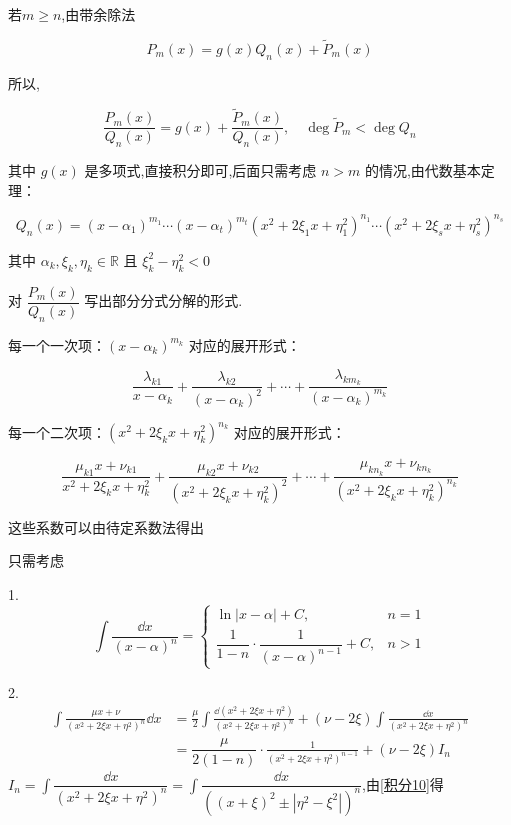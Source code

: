 \begin{solution}
	若\( m \geqslant n \),由带余除法 
	
	\[
	P_m(x) = g(x) Q_n(x) + \tilde{P}_m(x)
	\]
	
	所以,
	
	\[
	\frac{P_m(x)}{Q_n(x)} = g(x) + \frac{\tilde{P}_m(x)}{Q_n(x)}, \quad \deg \tilde{P}_m < \deg Q_n
	\]
	
	其中 \( g(x) \) 是多项式,直接积分即可,后面只需考虑 \( n > m \) 的情况,由代数基本定理：
	
	\[
	Q_n(x) = (x - \alpha_1)^{m_1} \cdots (x - \alpha_t)^{m_t} (x^2 + 2\xi_1 x + \eta_1^2)^{n_1} \cdots (x^2 + 2\xi_s x + \eta_s^2)^{n_s}
	\]
	
	其中 \(\alpha_k, \xi_k, \eta_k \in \mathbb{R}\) 且 \(\xi_k^2 - \eta_k^2 < 0\)
	
	对 \(\dfrac{P_m(x)}{Q_n(x)}\) 写出部分分式分解的形式.
	
	每一个一次项：$(x - \alpha_k)^{m_k}$ 对应的展开形式：
	
	\[
	\frac{\lambda_{k1}}{x - \alpha_k} + \frac{\lambda_{k2}}{(x - \alpha_k)^2} + \cdots + \frac{\lambda_{km_k}}{(x - \alpha_k)^{m_k}}
	\]
	
	每一个二次项：$(x^2 + 2\xi_k x + \eta_k^2)^{n_k}$ 对应的展开形式：
	
	\[
	\frac{\mu_{k1}x + \nu_{k1}}{x^2 + 2\xi_k x + \eta_k^2} + \frac{\mu_{k2}x + \nu_{k2}}{(x^2 + 2\xi_k x + \eta_k^2)^2} + \cdots + \frac{\mu_{kn_k}x + \nu_{kn_k}}{(x^2 + 2\xi_k x + \eta_k^2)^{n_k}}
	\]
	
	这些系数可以由待定系数法得出
	
	只需考虑
	
	1.
	\[
	\int \frac{\dd x}{(x - \alpha)^n} =
	\begin{cases}
		\ln |x - \alpha| + C, & n = 1 \\
		\dfrac{1}{1-n} \cdot \dfrac{1}{(x - \alpha)^{n-1}} + C, & n >1
	\end{cases}
	\]
	
	2.\[\begin{aligned}
		\int \frac{\mu x + \nu}{(x^2 + 2\xi x + \eta^2)^n} \dd x &= \frac{\mu}{2} \int \frac{\dd(x^2 + 2\xi x + \eta^2)}{(x^2 + 2\xi x + \eta^2)^n} + (\nu-2\xi) \int \frac{\dd x}{(x^2 + 2\xi x + \eta^2)^n}\\&= \dfrac{\mu}{2(1-n)} \cdot \frac{1}{(x^2 + 2\xi x + \eta^2)^{n-1}} + (\nu-2\xi) I_n
	\end{aligned}\]
	$I_n=\displaystyle\int\dfrac{\dd x}{(x^2+2\xi x+\eta^2)^n}=\displaystyle\int\dfrac{\dd x}{((x+\xi)^2\pm|\eta^2-\xi^2|)^n}$,由\ref{积分10}得
\end{solution}
